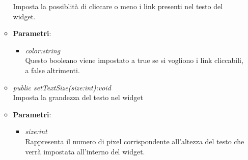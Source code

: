 \begin{itemize}
\begin{itemize}
	Imposta la possiblità di cliccare o meno i link presenti nel testo del widget.
		\item{\textbf{Parametri}: \begin{itemize}
		\item \textit{color:string}\\
		Questo booleano viene impostato a true se si vogliono i link cliccabili, a false altrimenti.
		\end{itemize}}
	\item \textit{public setTextSize(size:int):void}\\
	Imposta la grandezza del testo nel widget
		\item{\textbf{Parametri}: \begin{itemize}
		\item \textit{size:int}\\
		Rappresenta il numero di pixel corrispondente all'altezza del testo che verrà impostata all'interno del widget.
		\end{itemize}}
	\end{itemize}
\end{itemize}

